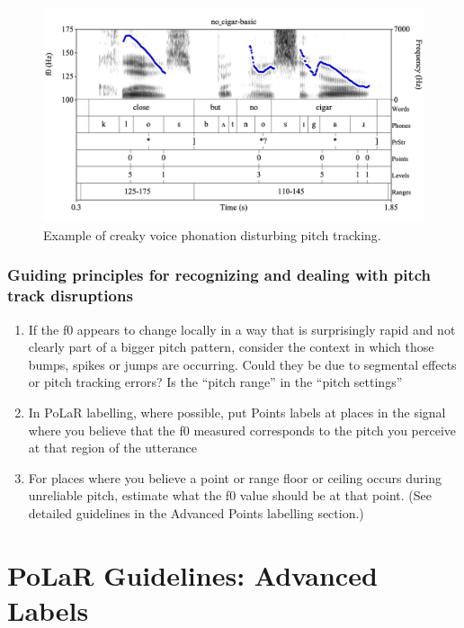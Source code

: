 \documentclass[11pt, twoside]{memoir}
\begin{document}
\begin{figure}[H]
\centering
%
\includegraphics[width=.875\linewidth]{Levels-no_cigar-basic.png}
%
\caption{Example of creaky voice phonation disturbing pitch tracking.%
\label{fig:no_cigar f0-tracking}%
%
}
\end{figure}


\subsection{Guiding principles for recognizing and dealing with pitch track disruptions}\label{sec:guiding-principles-for-recognizing-and-dealing-with-pitch-track-disruptions}

\begin{enumerate} \def\labelenumi{\arabic{enumi}.}
\item If the f0 appears to change locally in a way that is surprisingly rapid and not clearly part of a bigger pitch pattern, consider the context in which those bumps, spikes or jumps are occurring. Could they be due to segmental effects or pitch tracking errors? Is the “pitch range” in the “pitch settings”
\item In PoLaR labelling, where possible, put Points labels at places in the signal where you believe that the f0 measured corresponds to the pitch you perceive at that region of the utterance
\item For places where you believe a point or range floor or ceiling occurs during unreliable pitch, estimate what the f0 value should be at that point. (See detailed guidelines in the Advanced Points labelling section.) \end{enumerate}




\chapter{PoLaR Guidelines: Advanced Labels}\label{ch:advanced}
\end{document}
